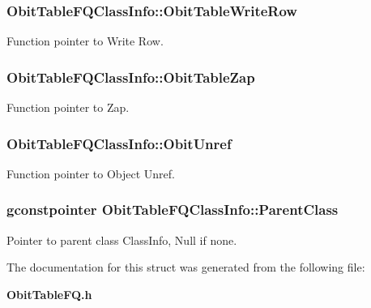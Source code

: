 \subsubsection{ {\bf Obit\-Table\-FQClass\-Info::Obit\-Table\-Write\-Row}}\label{structObitTableFQClassInfo_o26}


Function pointer to Write Row. 

\subsubsection{ {\bf Obit\-Table\-FQClass\-Info::Obit\-Table\-Zap}}\label{structObitTableFQClassInfo_o19}


Function pointer to Zap. 

\subsubsection{ {\bf Obit\-Table\-FQClass\-Info::Obit\-Unref}}\label{structObitTableFQClassInfo_o11}


Function pointer to Object Unref. 

\subsubsection{\setlength{\rightskip}{0pt plus 5cm}gconstpointer {\bf Obit\-Table\-FQClass\-Info::Parent\-Class}}\label{structObitTableFQClassInfo_o3}


Pointer to parent class Class\-Info, Null if none. 



The documentation for this struct was generated from the following file:\begin{CompactItemize}
\item 
{\bf Obit\-Table\-FQ.h}\end{CompactItemize}
